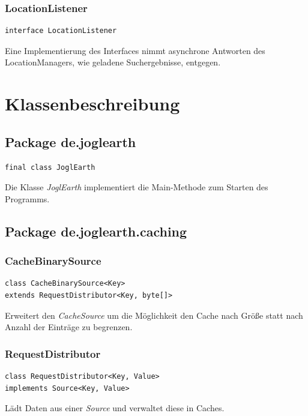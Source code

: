 \documentclass[10pt]{scrreprt}
\begin{document}
\vspace{5mm}
\subsection*{LocationListener}
\begin{lstlisting}
interface LocationListener
\end{lstlisting}
Eine Implementierung des Interfaces nimmt asynchrone Antworten des LocationManagers, wie geladene Suchergebnisse, entgegen.\\




\chapter{Klassenbeschreibung}
\section{Package de.joglearth}
\begin{lstlisting}
final class JoglEarth
\end{lstlisting}
Die Klasse \textit{JoglEarth} implementiert die Main-Methode zum Starten des Programms.\\

\vspace{5mm}
\section{Package de.joglearth.caching}
\subsection*{CacheBinarySource}
\begin{lstlisting}
class CacheBinarySource<Key>
extends RequestDistributor<Key, byte[]>
\end{lstlisting}
Erweitert den \textit{CacheSource} um die Möglichkeit den Cache nach Größe statt nach Anzahl der Einträge zu begrenzen.\\

\vspace{5mm}
\subsection*{RequestDistributor}
\begin{lstlisting}
class RequestDistributor<Key, Value>
implements Source<Key, Value>
\end{lstlisting}
Lädt Daten aus einer \textit{Source} und verwaltet diese in Caches.\\
\end{document}
